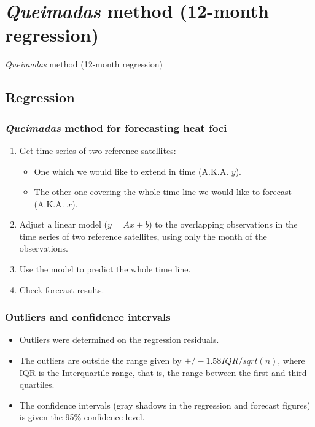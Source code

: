 \section{\textit{Queimadas} method (12-month regression)}

\begin{frame}
  \textit{Queimadas} method (12-month regression)
\end{frame}


\subsection{Regression}

\begin{frame}
  \frametitle{\textit{Queimadas} method for forecasting heat foci}
  \begin{enumerate}
    \item Get time series of two reference satellites:
    \begin{itemize}
      \item One which we would like to extend in time (A.K.A. $y$).
      \item The other one covering the whole time line we would like to
      forecast (A.K.A. $x$).
    \end{itemize}
    \item Adjust a linear model ($y = Ax + b$) to the overlapping observations
    in the time series of two reference satellites, using only the month of the
    observations.
    \item Use the model to predict the whole time line.
    \item Check forecast results.
  \end{enumerate}
\end{frame}

\begin{frame}[label=outliers_and_cis]
  \frametitle{Outliers and confidence intervals}
  \begin{itemize}
    \item Outliers were determined on the regression residuals.
    \item The outliers are outside the range given by $+/-1.58 IQR/sqrt(n)$,
      where IQR is the Interquartile range, that is, the range between the
      first and third quartiles.
    \item The confidence intervals (gray shadows in the regression and forecast
      figures) is given the 95\% confidence level.
  \end{itemize}
\end{frame}


